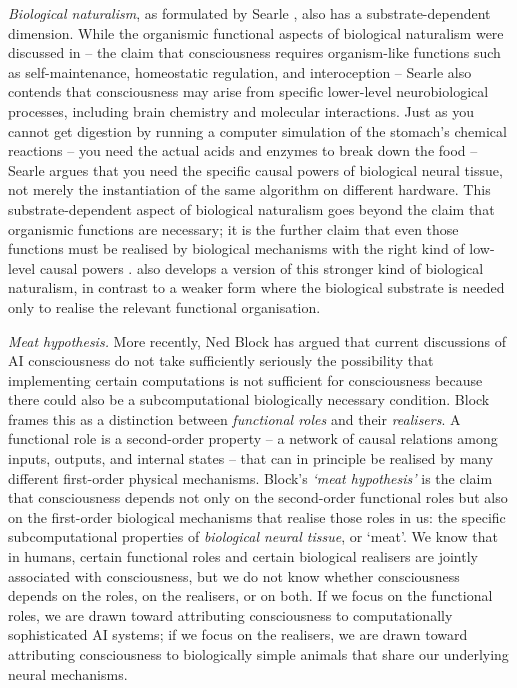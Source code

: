 \documentclass[11pt, a4paper, onecolumn, gdm]{google}
\begin{document}
\emph{Biological naturalism}, as formulated by Searle \citep{searle2017}, also has a substrate-dependent dimension.
While the organismic functional aspects of biological naturalism were discussed in  -- the claim that consciousness requires organism-like functions such as self-maintenance, homeostatic regulation, and interoception -- Searle also contends that consciousness may arise from specific lower-level neurobiological processes, including brain chemistry and molecular interactions.
Just as you cannot get digestion by running a computer simulation of the stomach's chemical reactions -- you need the actual acids and enzymes to break down the food -- Searle argues \citep{searle1992} that you need the specific causal powers of biological neural tissue, not merely the instantiation of the same algorithm on different hardware.
This substrate-dependent aspect of biological naturalism goes beyond the claim that organismic functions are necessary; it is the further claim that even those functions must be realised by biological mechanisms with the right kind of low-level causal powers \citep{searle1980}. 
\citet{seth2024,seth2026stuff} also develops a version of this stronger kind of biological naturalism, in contrast to a weaker form where the biological substrate is needed only to realise the relevant functional organisation.

\emph{Meat hypothesis.} More recently, Ned Block \citep{block2025} has argued that current discussions of AI consciousness do not take sufficiently seriously the possibility that implementing certain computations is not sufficient for consciousness because there could also be a subcomputational biologically necessary condition.
Block frames this as a distinction between \emph{functional roles} and their \emph{realisers}.
A functional role is a second-order property -- a network of causal relations among inputs, outputs, and internal states -- that can in principle be realised by many different first-order physical mechanisms.
Block's \emph{`meat hypothesis'} is the claim that consciousness depends not only on the second-order functional roles but also on the first-order biological mechanisms that realise those roles in us: the specific subcomputational properties of \emph{biological neural tissue}, or `meat'.
We know that in humans, certain functional roles and certain biological realisers are jointly associated with consciousness, but we do not know whether consciousness depends on the roles, on the realisers, or on both.
If we focus on the functional roles, we are drawn toward attributing consciousness to computationally sophisticated AI systems; if we focus on the realisers, we are drawn toward attributing consciousness to biologically simple animals that share our underlying neural mechanisms.
\end{document}
